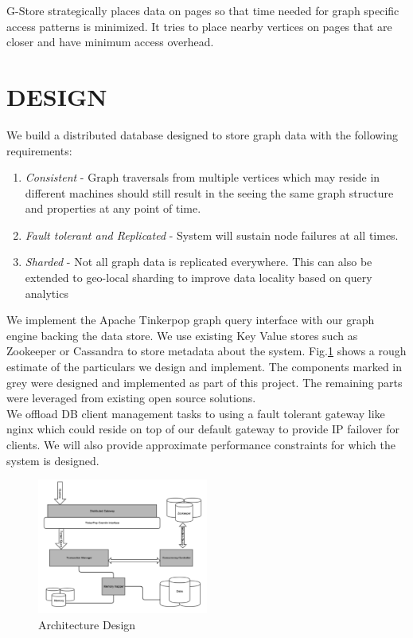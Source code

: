 \documentclass[letterpaper, 11 pt, conference]{ieeeconf}  %
\begin{document}
 G-Store\cite{g-store} strategically places data on pages so that time needed for graph specific access patterns is minimized. It tries to place nearby vertices on pages that are closer and have minimum access overhead. 




\section{DESIGN}

We build a distributed database designed to store graph data with the following requirements: \\
\begin{enumerate}
\item \textit{Consistent} - Graph traversals from multiple vertices which may reside in different machines should still result in the seeing the same graph structure and properties at any point of time.
\item \textit{Fault tolerant and Replicated} - System will sustain node failures at all times.
\item \textit{Sharded} - Not all graph data is replicated everywhere. This can also be extended to geo-local sharding to improve data locality based on query analytics \\
\end{enumerate} 

We implement the Apache Tinkerpop\cite{tinkerpop} graph query interface with our graph engine backing the data store. We use existing Key Value stores such as Zookeeper or Cassandra to store metadata about the system. Fig.\ref{fig:arch} shows a rough estimate of the particulars we design and implement. The components marked in grey were designed and implemented as part of this project. The remaining parts were leveraged from existing open source solutions. \\
We offload DB client management tasks to using a fault tolerant gateway like nginx which could reside on top of our default gateway to provide IP failover for clients. We will also provide approximate performance constraints for which the system is designed.\\
\begin{figure}
 \centering
  \includegraphics[width=0.5\textwidth]{arch.png}
\caption{Architecture Design}
\label{fig:arch}
\end{figure}
\end{document}
